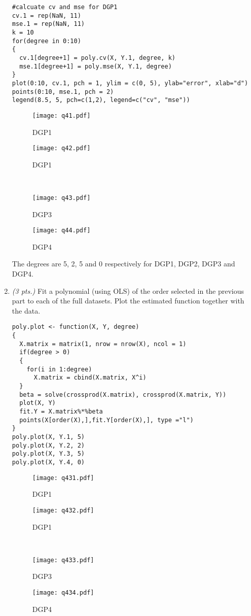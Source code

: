 \documentclass[11pt,english]{article}
\begin{document}
\begin{enumerate}
\begin{verbatim}
#calcuate cv and mse for DGP1
cv.1 = rep(NaN, 11)
mse.1 = rep(NaN, 11)
k = 10
for(degree in 0:10)
{
  cv.1[degree+1] = poly.cv(X, Y.1, degree, k)
  mse.1[degree+1] = poly.mse(X, Y.1, degree)
}
plot(0:10, cv.1, pch = 1, ylim = c(0, 5), ylab="error", xlab="d")
points(0:10, mse.1, pch = 2)
legend(8.5, 5, pch=c(1,2), legend=c("cv", "mse"))
\end{verbatim}
\begin{figure}[H]
\begin{minipage}[t]{0.5\linewidth}
\centering
\texttt{[image: q41.pdf]}
\caption{DGP1}
\end{minipage}%
\begin{minipage}[t]{0.5\linewidth}
\centering
\texttt{[image: q42.pdf]}
\caption{DGP1}
\end{minipage} \\
\begin{minipage}[t]{0.5\linewidth}
\centering
\texttt{[image: q43.pdf]}
\caption{DGP3}
\end{minipage}%
\begin{minipage}[t]{0.5\linewidth}
\centering
\texttt{[image: q44.pdf]}
\caption{DGP4}
\end{minipage}
\end{figure}
The degrees are 5, 2, 5 and 0 respectively for DGP1, DGP2, DGP3 and DGP4.
    \item \textit{(3 pts.)} Fit a polynomial (using OLS) of the order selected in the previous part to each of the full datasets. Plot the estimated function together with the data.
\begin{verbatim}
poly.plot <- function(X, Y, degree)
{
  X.matrix = matrix(1, nrow = nrow(X), ncol = 1)
  if(degree > 0)
  {
    for(i in 1:degree)
      X.matrix = cbind(X.matrix, X^i)
  }
  beta = solve(crossprod(X.matrix), crossprod(X.matrix, Y))
  plot(X, Y)
  fit.Y = X.matrix%*%beta
  points(X[order(X),],fit.Y[order(X),], type ="l")
}
poly.plot(X, Y.1, 5)
poly.plot(X, Y.2, 2)
poly.plot(X, Y.3, 5)
poly.plot(X, Y.4, 0)
\end{verbatim}
\begin{figure}[H]
\begin{minipage}[t]{0.5\linewidth}
\centering
\texttt{[image: q431.pdf]}
\caption{DGP1}
\end{minipage}%
\begin{minipage}[t]{0.5\linewidth}
\centering
\texttt{[image: q432.pdf]}
\caption{DGP1}
\end{minipage} \\
\begin{minipage}[t]{0.5\linewidth}
\centering
\texttt{[image: q433.pdf]}
\caption{DGP3}
\end{minipage}%
\begin{minipage}[t]{0.5\linewidth}
\centering
\texttt{[image: q434.pdf]}
\caption{DGP4}
\end{minipage}
\end{figure}


\end{enumerate}
\end{document}
